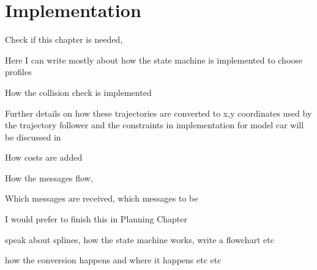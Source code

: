 \chapter{Implementation}
\label{implementation}
Check if this chapter is needed, 

Here I can write mostly about how the state machine is implemented to choose profiles

How the collision check is implemented

Further details on how these trajectories are converted to x,y coordinates used by the trajectory follower and the constraints in implementation for model car will be discussed in

How costs are added


How the messages flow, 


Which messages are received, which messages to be 

I would prefer to finish this in Planning Chapter 

speak about splines, how the state machine works, write a flowchart etc

how the conversion happens and where it happens etc etc